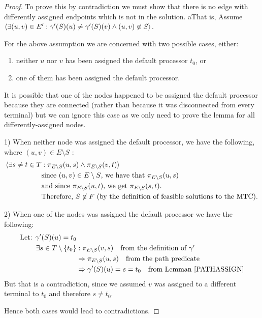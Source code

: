 \begin{proof}
To prove this by contradiction we must show that there is no edge with differently assigned endpoints which is not in the solution.
aThat is, Assume $\langle \exists (u,v) \in E' : \gamma'(S)(u) \neq \gamma'(S)(v) \wedge (u,v) \not\in S \rangle$.

For the above assumption we are concerned with two possible cases, either:
\begin{enumerate}
	\item neither $u$ nor $v$ has been assigned the default processor $t_0$, or
	\item one of them has been assigned the default processor.
\end{enumerate}

\noindent It is possible that one of the nodes happened to be assigned the default processor because they are connected (rather than because it was disconnected from every terminal) but we can ignore this case as we only need to prove the lemma for all differently-assigned nodes.

1) When neither node was assigned the default processor, we have the following, where $(u, v) \in E \setminus S$ :
\begin{align}
	\nonumber \langle \exists s \neq t \in T  & : \pi_{E \setminus S}(u, s) \wedge \pi_{E \setminus S}(v, t) \rangle \\
	\nonumber & \mbox{since $(u, v) \in E \setminus S$, we have that $\pi_{E \setminus S}(u, s)$} \\
	\nonumber & \mbox{and since $\pi_{E \setminus S}(u, t)$, we get $\pi_{E \setminus S}(s, t)$.} \\
	\nonumber & \mbox{Therefore, $S \not\in F$ (by the definition of feasible solutions to the MTC).}
\end{align}

2) When one of the nodes was assigned the default processor we have the following:
\begin{align}
	\nonumber \mbox{Let: } \gamma'(S)(u) = t_0 & \\
	\nonumber \exists s \in T \setminus \{t_0\} & : \pi_{E \setminus S}(v, s) \quad \mbox{from the definition of $\gamma'$}\\
	\nonumber & \Rightarrow \pi_{E \setminus S}(u, s) \quad \mbox{from the path predicate}\\
	\nonumber & \Rightarrow \gamma'(S)(u) = s = t_0 \quad \mbox{from Lemman \ref{PATHASSIGN}}
\end{align}
But that is a contradiction, since we assumed $v$ was assigned to a different terminal to $t_0$ and therefore $s \neq t_0$.

Hence both cases would lead to contradictions.
\end{proof}

